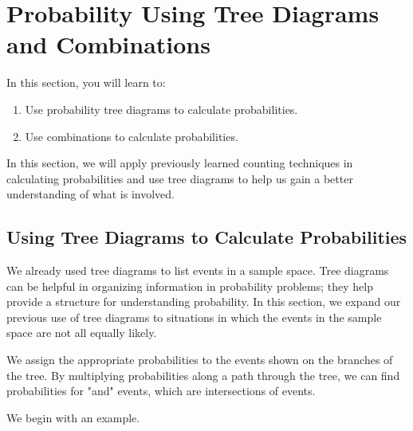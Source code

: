 \section{Probability Using Tree Diagrams and Combinations}\label{section_probability_tree_and_combinations}

In this section, you will learn to:
\begin{enumerate}
    \item Use probability tree diagrams to calculate probabilities.
    \item Use combinations to calculate probabilities.
\end{enumerate}

In this section, we will apply previously learned counting techniques in calculating probabilities and use tree diagrams to help us gain a better understanding of what is involved.

\subsection{Using Tree Diagrams to Calculate Probabilities}

We already used tree diagrams to list events in a sample space. Tree diagrams can be helpful in organizing information in probability problems; they help provide a structure for understanding probability. In this section, we expand our previous use of tree diagrams to situations in which the events in the sample space are not all equally likely.

We assign the appropriate probabilities to the events shown on the branches of the tree. By multiplying probabilities along a path through the tree, we can find probabilities for "and" events, which are intersections of events.

We begin with an example.

